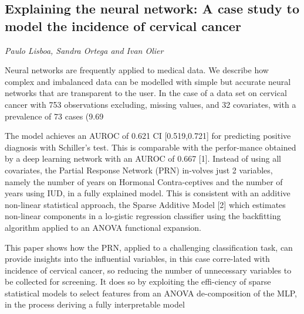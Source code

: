 \documentclass[../booklet.tex]{subfiles}
\begin{document}
\subsection[Explaining the neural network: A case study to model the incidence of cervical cancer. {\it Paulo Lisboa, Sandra Ortega and Ivan Olier}]{Explaining the neural network: A case study to model the incidence of cervical cancer}
  

\begin{center}
  {\it Paulo Lisboa, Sandra Ortega and Ivan Olier}
\end{center}

\vskip 0.8cm

Neural networks are frequently applied to medical data. We describe how complex and imbalanced data can be modelled with simple but accurate neural networks that are transparent to the user. In the case of a data set on cervical cancer with 753 observations excluding, missing values, and 32 covariates, with a prevalence of 73 cases (9.69%

     The model achieves an AUROC of 0.621 CI [0.519,0.721] for predicting positive diagnosis with Schiller's test.  This is comparable with the perfor-mance obtained by a deep learning network with an AUROC of 0.667 [1]. Instead of using all covariates, the Partial Response Network (PRN) in-volves just 2 variables, namely the number of years on Hormonal Contra-ceptives and the number of years using IUD, in a fully explained model. This is consistent with an additive non-linear statistical approach, the Sparse Additive Model [2] which estimates non-linear components in a lo-gistic regression classifier using the backfitting algorithm applied to an ANOVA functional expansion.

     This paper shows how the PRN, applied to a challenging classification task, can provide insights into the influential variables, in this case corre-lated with incidence of cervical cancer, so reducing the number of unnecessary variables to be collected for screening. It does so by exploiting the effi-ciency of sparse statistical models to select features from an ANOVA de-composition of the MLP, in the process deriving a fully interpretable model

\end{document}
